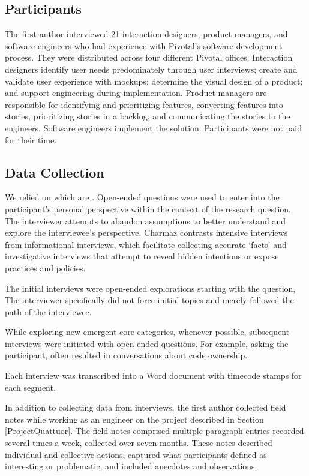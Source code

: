 \subsection{Participants}
The first author interviewed 21 interaction designers, product managers, and software engineers who had experience with Pivotal's software development process. They were distributed across four different Pivotal offices. Interaction designers identify user needs predominately through user interviews; create and validate user experience with mockups; determine the visual design of a product; and support engineering during implementation. Product managers are responsible for identifying and prioritizing features, converting features into stories, prioritizing stories in a backlog, and communicating the stories to the engineers. Software engineers implement the solution. Participants were not paid for their time. 
\subsection{Data Collection}
We relied on  which are  \cite{Charmaz}. Open-ended questions were used to enter into the participant's personal perspective within the context of the research question. The interviewer attempts to abandon assumptions to better understand and explore the interviewee's perspective. Charmaz \cite{Charmaz} contrasts intensive interviews from informational interviews, which facilitate collecting accurate `facts’ and investigative interviews that attempt to reveal hidden intentions or expose practices and policies. 
 
The initial interviews were open-ended explorations starting with the question,  The interviewer specifically did not force initial topics and merely followed the path of the interviewee. 

While exploring new emergent core categories, whenever possible, subsequent interviews were initiated with open-ended questions.  For example, asking the participant,  often resulted in conversations about code ownership. 

Each interview was transcribed into a Word document with timecode stamps for each segment.

In addition to collecting data from interviews, the first author collected field notes while working as an engineer on the project described in Section \ref{ProjectQuattuor}. The field notes comprised multiple paragraph entries recorded several times a week, collected over seven months. These notes described individual and collective actions, captured what participants defined as interesting or problematic, and included anecdotes and observations. 

